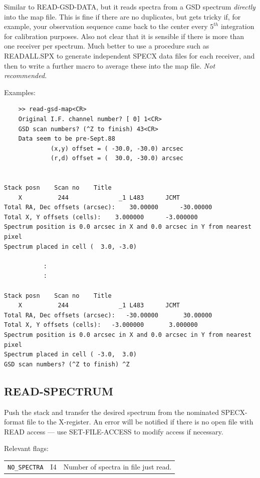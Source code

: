 \documentclass[11pt,twoside]{report}
\begin{document}
Similar to READ-GSD-DATA, but it reads spectra from a GSD spectrum
{\em directly} into the map file. This is fine if there are no duplicates,
but gets tricky if, for example, your observation sequence came back to the
center every $5^{th}$ integration for calibration purposes. Also not clear
that it is sensible if there is more than one receiver per spectrum. Much
better to use a procedure such as READALL.SPX to generate independent SPECX
data files for each receiver, and then to write a further macro to average
these into the map file. {\em Not recommended.}

Examples:
\begin{verbatim}
    >> read-gsd-map<CR>
    Original I.F. channel number? [ 0] 1<CR>
    GSD scan numbers? (^Z to finish) 43<CR>
    Data seem to be pre-Sept.88
             (x,y) offset = ( -30.0, -30.0) arcsec
             (r,d) offset = (  30.0, -30.0) arcsec


Stack posn    Scan no    Title
    X          244              _1 L483      JCMT
Total RA, Dec offsets (arcsec):    30.00000      -30.00000
Total X, Y offsets (cells):    3.000000      -3.000000
Spectrum position is 0.0 arcsec in X and 0.0 arcsec in Y from nearest pixel
Spectrum placed in cell (  3.0, -3.0)

           :
           :

Stack posn    Scan no    Title
    X          244              _1 L483      JCMT
Total RA, Dec offsets (arcsec):   -30.00000       30.00000
Total X, Y offsets (cells):   -3.000000       3.000000
Spectrum position is 0.0 arcsec in X and 0.0 arcsec in Y from nearest pixel
Spectrum placed in cell ( -3.0,  3.0)
GSD scan numbers? (^Z to finish) ^Z
\end{verbatim}

\subsection{READ-SPECTRUM} 

Push the stack and transfer the desired spectrum from the nominated
SPECX-format file to the X-register. An error will be notified if there is no
open file with READ access --- use SET-FILE-ACCESS to modify access if
 necessary.

Relevant flags:\\
\begin{tabular}{lll}
  \verb+NO_SPECTRA+ &I4 & Number of spectra in file just read.
\end{tabular}
\end{document}
